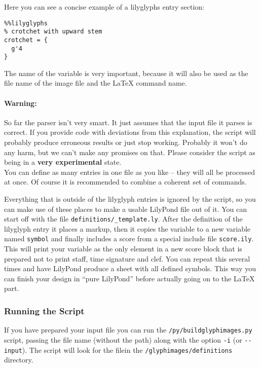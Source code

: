 \documentclass{article}
\begin{document}
Here you can see a concise example of a lilyglyphs entry section:

\begin{verbatim}
%%lilyglyphs
% crotchet with upward stem
crotchet = {
  g'4
}
\end{verbatim}
The name of the variable is very important, because it will also be used as the file name of the image file and the \LaTeX{} command name.

\paragraph*{Warning:}
So far the parser isn't very smart.
It just assumes that the input file it parses is correct.
If you provide code with deviations from this explanation, the script will probably produce erroneous results or just stop working.
Probably it won't do any harm, but we can't make any promises on that.
Please consider the script as being in a \textbf{very experimental} state.\\


You can define as many entries in one file as you like -- they will all be processed at once. 
Of course it is recommended to combine a coherent set of commands.

Everything that is outside of the lilyglyph entries is ignored by the script, so you can make use of these places to make a usable LilyPond file out of it.
You can start off with the file \texttt{definitions/\_template.ly}.
After the definition of the lilyglyph entry it places a markup, then it copies the variable to a new variable named \texttt{symbol} and finally includes a score from a special include file \texttt{score.ily}.
This will print your variable as the only element in a new score block that is prepared not to print staff, time signature and clef.
You can repeat this several times and have LilyPond produce a sheet with all defined symbols.
This way you can finish your design in “pure LilyPond” before actually going on to the \LaTeX{} part.


\subsubsection{Running the Script}
\label{subsubsec:BGI_running}

If you have prepared your input file you can run the \texttt{/py/buildglyphimages.py} script, passing the file name (without the path) along with the option \verb|-i| (or \verb|--input|). The script will look for the filein the \texttt{/glyphimages/definitions} directory.
\end{document}
